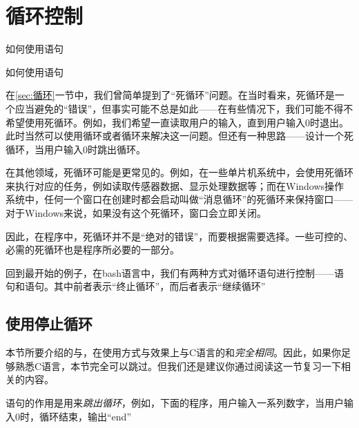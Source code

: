 \section{循环控制}\label{sec:循环控制}

\begin{Abstract}
    \item 如何使用语句
    \item 如何使用语句
\end{Abstract}

在\ref{sec:循环}一节中，我们曾简单提到了“死循环”问题。在当时看来，死循环是一个应当避免的“错误”，但事实可能不总是如此——在有些情况下，我们可能不得不希望使用死循环。例如，我们希望一直读取用户的输入，直到用户输入0时退出。此时当然可以使用循环或者循环来解决这一问题。但还有一种思路——设计一个死循环，当用户输入0时跳出循环。

\begin{extend}
    在其他领域，死循环可能是更常见的。例如，在一些单片机系统中，会使用死循环来执行对应的任务，例如读取传感器数据、显示处理数据等；而在Windows操作系统中，任何一个窗口在创建时都会启动叫做“消息循环”的死循环来保持窗口——对于Windows来说，如果没有这个死循环，窗口会立即关闭。

    因此，在程序中，死循环并不是“绝对的错误”，而要根据需要选择。一些可控的、必需的死循环也是程序所必要的一部分。
\end{extend}

回到最开始的例子，在bash语言中，我们有两种方式对循环语句进行控制——语句和语句。其中前者表示“终止循环”，而后者表示“继续循环”



\subsection{使用停止循环}\label{subsec:循环控制-使用break停止循环}

\begin{extend}
    本节所要介绍的与，在使用方式与效果上与C语言的和\emph{完全相同}。因此，如果你足够熟悉C语言，本节完全可以跳过。但我们还是建议你通过阅读这一节复习一下相关的内容。
\end{extend}

语句的作用是用来\emph{跳出循环}，例如，下面的程序，用户输入一系列数字，当用户输入0时，循环结束，输出“end”

